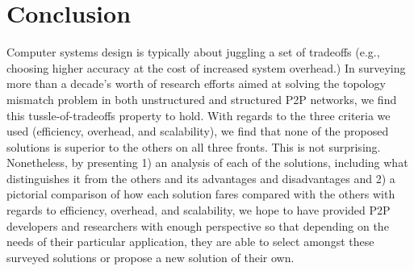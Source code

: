 \section{Conclusion}
\label{section:conclusion}

Computer systems design is typically about juggling a set of tradeoffs (e.g.,
choosing higher accuracy at the cost of increased system overhead.)  
In surveying more than
a decade's worth of research efforts aimed at solving the topology mismatch
problem in both unstructured and structured P2P networks, we find this
tussle-of-tradeoffs property to hold.  With regards to the three criteria 
we used (efficiency,
overhead, and scalability), we find that none of the proposed solutions 
is superior to the others on all three fronts.  This is not surprising.
Nonetheless, by presenting 1) an
analysis of each of the solutions, including what distinguishes it from the
others and its advantages and disadvantages and 
2) a pictorial
comparison of how each solution fares compared with the others with regards
to efficiency, overhead, and scalability, we hope to have provided P2P
developers and researchers 
with enough perspective so that depending on the needs of their particular
application, they are able to select
amongst these surveyed solutions or propose a new solution of their own.


